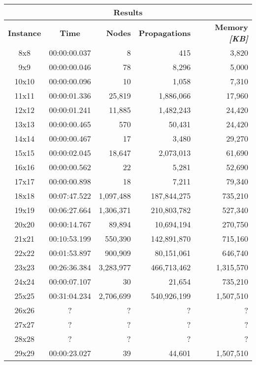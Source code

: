 
\begin{center}
    \begin{tabular}{|c|c|r|r|r|}
        \hline
        \multicolumn{5}{|c|}{\textbf{Results}} \\
        \hline
        \textbf{Instance} & \textbf{Time} & \textbf{Nodes} & \textbf{Propagations} & \textbf{Memory \textit{[KB]}} \\
        
        \hline
		8x8 & 00:00:00.037 & 8 & 415 & 3,820 \\ \hline
		9x9 & 00:00:00.046 & 78 & 8,296 & 5,000 \\ \hline
		10x10 & 00:00:00.096 & 10 & 1,058 & 7,310 \\ \hline
		11x11 & 00:00:01.336 & 25,819 & 1,886,066 & 17,960 \\ \hline
		12x12 & 00:00:01.241 & 11,885 & 1,482,243 & 24,420 \\ \hline
		13x13 & 00:00:00.465 & 570 & 50,431 & 24,420 \\ \hline
		14x14 & 00:00:00.467 & 17 & 3,480 & 29,270 \\ \hline
		15x15 & 00:00:02.045 & 18,647 & 2,073,013 & 61,690 \\ \hline
		16x16 & 00:00:00.562 & 22 & 5,281 & 52,690 \\ \hline
		17x17 & 00:00:00.898 & 18 & 7,211 & 79,340 \\ \hline
		18x18 & 00:07:47.522 & 1,097,488 & 187,844,275 & 735,210 \\ \hline
		19x19 & 00:06:27.664 & 1,306,371 & 210,803,782 & 527,340 \\ \hline
		20x20 & 00:00:14.767 & 89,894 & 10,694,194 & 270,750 \\ \hline
		21x21 & 00:10:53.199 & 550,390 & 142,891,870 & 715,160 \\ \hline
		22x22 & 00:01:53.897 & 900,909 & 80,151,061 & 646,740 \\ \hline
		23x23 & 00:26:36.384 & 3,283,977 & 466,713,462 & 1,315,570 \\ \hline
		24x24 & 00:00:07.107 & 30 & 21,654 & 735,210 \\ \hline
		25x25 & 00:31:04.234 & 2,706,699 & 540,926,199 & 1,507,510 \\ \hline
		26x26 & ? & ? & ? & ? \\ \hline
		27x27 & ? & ? & ? & ? \\ \hline
		28x28 & ? & ? & ? & ? \\ \hline
		29x29 & 00:00:23.027 & 39 & 44,601 & 1,507,510 \\ \hline

\end{tabular}
\end{center}
